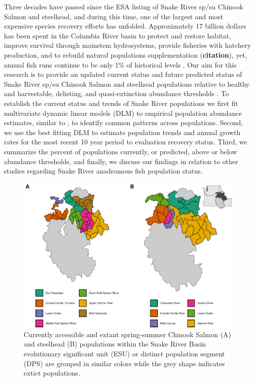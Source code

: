 \documentclass[10pt,a4paper]{article}
\begin{document}
Three decades have passed since the ESA listing of Snake River sp/su Chinook Salmon and steelhead, and during this time, one of the largest and most expensive species recovery efforts has unfolded. Approximately 17 billion dollars has been spent in the Columbia River basin to protect and restore habitat, improve survival through mainstem hydrosystems, provide fisheries with hatchery production, and to rebuild natural populations supplementation (\textbf{citation}), yet, annual fish runs continue to be only 1\% of historical levels \autocite{thurow_wild_2019,storch_review_2022,ford_biological_2022}. Our aim for this research is to provide an updated current status and future predicted status of Snake River sp/su Chinook Salmon and steelhead populations relative to healthy and harvestable, delisting, and quasi-extinction abundance thresholds \autocite{cbp_vision_2020}. To establish the current status and trends of Snake River populations we first fit multivariate dynamic linear models (DLM) to empirical population abundance estimates, similar to \textcite{ford_biological_2022}, to identify common patterns across populations. Second, we use the best fitting DLM to estimate population trends and annual growth rates for the most recent 10 year period to evaluation recovery status. Third, we summarize the percent of populations currently, or predicted, above or below abundance thresholds, and finally, we discuss our findings in relation to other studies regarding Snake River anadromous fish population status.

\begin{figure}
\centering
\includegraphics{manuscript_SRAFS_files/figure-latex/esu-map-1.pdf}
\caption{\label{fig:esu-map}Currently accessible and extant spring-summer Chinook Salmon (A) and steelhead (B) populations within the Snake River Basin evolutionary significant unit (ESU) or distinct population segment (DPS) are grouped in similar colors while the grey shape indicates extict populations.}
\end{figure}
\end{document}
